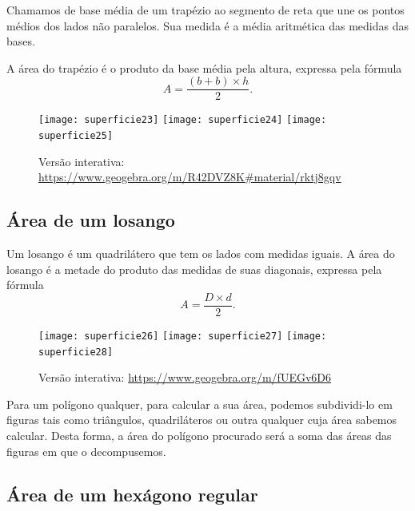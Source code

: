 Chamamos de base média de um trapézio ao segmento de reta que une os pontos médios dos lados não paralelos. Sua medida é a média aritmética das medidas das bases.

A área do trapézio é o produto da base média pela altura, expressa pela fórmula 
\begin{equation*}
A=\frac{(b+b)\times h}{2}.
\end{equation*}

\begin{figure}[H]
\centering

\texttt{[image: superficie23]}\hspace{.5em}
\texttt{[image: superficie24]}\hspace{.5em}
\texttt{[image: superficie25]}

\caption{Versão interativa: \url{https://www.geogebra.org/m/R42DVZ8K\#material/rktj8gqv}}
\end{figure}

\subsection{ Área de um losango}

Um losango é um quadrilátero que tem os lados com medidas iguais. A área do losango é a metade do produto das medidas de suas diagonais, expressa pela fórmula  
\begin{equation*}
A=\frac{D\times d}{2}.
\end{equation*}

\begin{figure}[H]
\centering

\texttt{[image: superficie26]}\hspace{.5em}
\texttt{[image: superficie27]}\hspace{.5em}
\texttt{[image: superficie28]}

\caption{Versão interativa: \url{https://www.geogebra.org/m/fUEGv6D6}}
\end{figure}

Para um polígono qualquer, para calcular a sua área, podemos subdividi-lo em figuras tais como triângulos, quadriláteros ou outra qualquer cuja área sabemos calcular. Desta forma, a área do polígono procurado será a soma das áreas das figuras em que o decompusemos.

\subsection{ Área de um hexágono regular}

